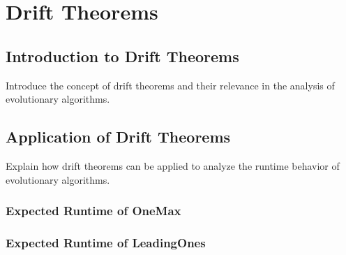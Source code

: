 \section{Drift Theorems}
\subsection{Introduction to Drift Theorems}
Introduce the concept of drift theorems and their relevance in the analysis of evolutionary algorithms.

\subsection{Application of Drift Theorems}
Explain how drift theorems can be applied to analyze the runtime behavior of evolutionary algorithms.

\subsubsection{Expected Runtime of OneMax}

\subsubsection{Expected Runtime of LeadingOnes}
